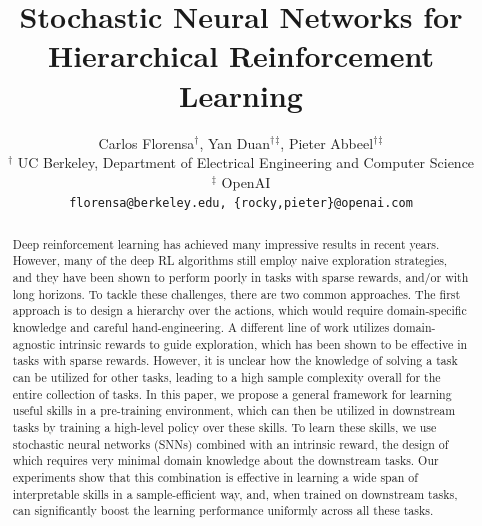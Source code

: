 \documentclass{article} %
\title{Stochastic Neural Networks for \\Hierarchical Reinforcement Learning}
\author{Carlos Florensa${^\dagger}$, Yan Duan${^\dagger}{^\ddagger}$, Pieter Abbeel${^\dagger}{^\ddagger}$ \\
$^\dagger$ UC Berkeley, Department of Electrical Engineering and Computer Science\\
$^\ddagger$ OpenAI\\
\texttt{florensa@berkeley.edu, \{rocky,pieter\}@openai.com}
}
\begin{document}
	
	\maketitle

\begin{abstract}








Deep reinforcement learning has achieved many impressive results in recent years. However, many of the deep RL algorithms still employ naive exploration strategies, and they have been shown to perform poorly in tasks with sparse rewards, and/or with long horizons. To tackle these challenges, there are two common approaches. The first approach is to design a hierarchy over the actions, which would require domain-specific knowledge and careful hand-engineering. A different line of work utilizes domain-agnostic intrinsic rewards to guide exploration, which has been shown to be effective in tasks with sparse rewards. However, it is unclear how the knowledge of solving a task can be utilized for other tasks, leading to a high sample complexity overall for the entire collection of tasks. In this paper, we propose a general framework for learning useful skills in a pre-training environment, which can then be utilized in downstream tasks by training a high-level policy over these skills. To learn these skills, we use stochastic neural networks (SNNs) combined with an intrinsic reward, the design of which requires very minimal domain knowledge about the downstream tasks. Our experiments show that this combination is effective in learning a wide span of interpretable skills in a sample-efficient way, and, when trained on downstream tasks, can significantly boost the learning performance uniformly across all these tasks. 


\end{abstract}
\end{document}
